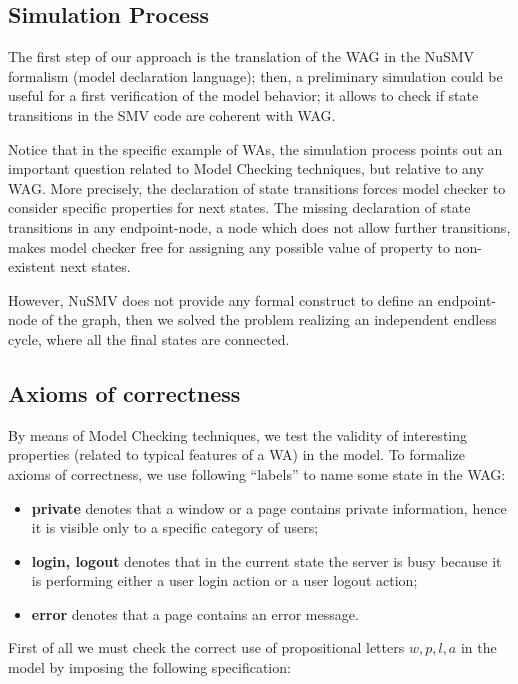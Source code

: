 \normalsize
\subsection{Simulation Process}
The first step of our approach is the translation of the WAG in the NuSMV formalism (model declaration language); then, a preliminary simulation could be useful for a first verification of the model behavior; it allows to check if state transitions in the SMV code are coherent with WAG.

Notice that in the specific example of WAs, the simulation process points out an important question related to Model Checking techniques, but relative to any WAG. More precisely, the declaration of state transitions forces model checker to consider specific properties for next states. The missing declaration of state transitions in any endpoint-node, \ie a node which does not allow further transitions, makes model checker free for assigning any possible value of property to non-existent next states. 

However, NuSMV does not provide any formal construct to define an endpoint-node of the graph, then we solved the problem realizing an independent endless cycle, where all the final states are connected.




\subsection{Axioms of correctness}
By means of Model Checking techniques, we test the validity of interesting properties (related to typical features of a WA) in the model. 
To formalize axioms of correctness, we use following ``labels'' to name some state in the WAG:

\footnotesize
\begin{itemize}
	\item \textbf{private} denotes that a window or a page contains private information, hence it is visible only to a specific category of users;
	\item \textbf{login, logout} denotes that in the current state the server is busy because it is performing either a user login action or a user logout action;
	\item \textbf{error} denotes that a page contains an error message.
\end{itemize}

\normalsize
First of all we must check the correct use of propositional letters $w, p, l, a$ in the model by imposing the following \ctl specification:

